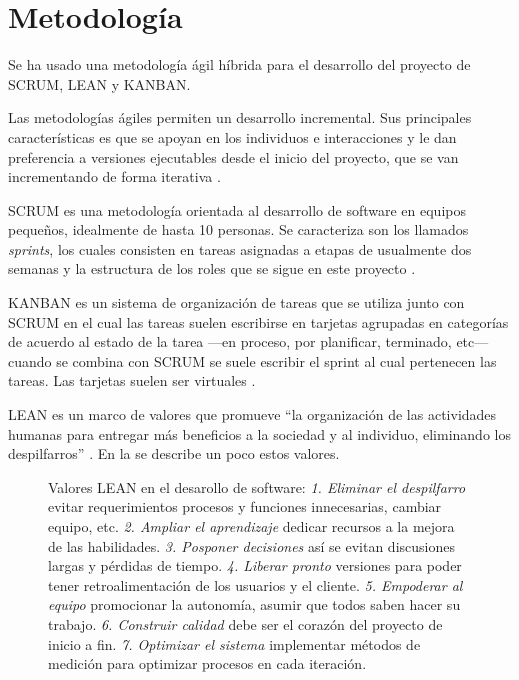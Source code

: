 \section{Metodología}
\label{sec:metodologia}


Se ha usado una metodología ágil híbrida para el desarrollo del proyecto de SCRUM, LEAN y KANBAN.  

Las metodologías ágiles permiten un desarrollo incremental. Sus principales
características es que se apoyan en los individuos e interacciones y le dan preferencia a versiones ejecutables desde el inicio del proyecto, que se van incrementando de forma iterativa \parencite{pmi2017}. 

SCRUM es una metodología orientada al desarrollo de software en equipos pequeños, idealmente de hasta 10 personas. Se caracteriza son los llamados \textit{sprints}, los cuales consisten en tareas asignadas a etapas de usualmente dos semanas y la estructura de los roles que se sigue en este proyecto \parencite{schwaber2020}.

KANBAN es un sistema de organización de tareas que se utiliza junto con SCRUM en el cual las tareas suelen escribirse en tarjetas agrupadas en categorías de acuerdo al estado de la tarea —en proceso, por planificar, terminado, etc— cuando se combina con SCRUM se suele escribir el sprint al cual pertenecen las tareas. Las tarjetas suelen ser virtuales \parencite{stellman2014}. 

LEAN es un marco de valores que promueve ``la organización de las actividades humanas para entregar más beneficios a la sociedad y al individuo, eliminando los despilfarros'' \parencite{womack2003}. En la  se describe un poco estos valores.

\begin{figure}
    \centering
    \caption[Pensamiento LEAN]{Valores LEAN en el desarollo de software: \textit{1. Eliminar el despilfarro} evitar requerimientos procesos y funciones innecesarias, cambiar equipo, etc. \textit{2. Ampliar el aprendizaje} dedicar recursos a la mejora de las habilidades. \textit{3. Posponer decisiones} así se evitan discusiones largas y pérdidas de tiempo. \textit{4. Liberar pronto} versiones para poder tener retroalimentación de los usuarios y el cliente. \textit{5. Empoderar al equipo} promocionar la autonomía, asumir que todos saben hacer su trabajo. \textit{6. Construir calidad} debe ser el corazón del proyecto de inicio a fin. \textit{7. Optimizar el sistema} implementar métodos de medición para optimizar procesos en cada iteración.}
    \label{fig:penasmientolean}
    
  \end{figure}
  

